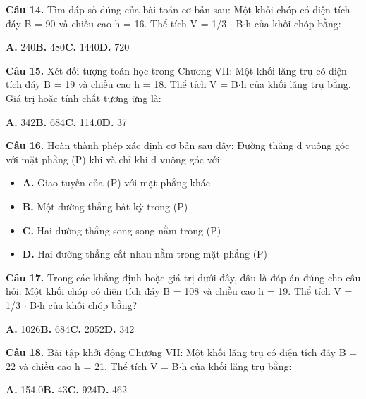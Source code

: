 \documentclass[11pt,a4paper]{article}
\begin{document}
\textbf{\color{primary} Câu 14.} Tìm đáp số đúng của bài toán cơ bản sau: Một khối chóp có diện tích đáy B = 90 và chiều cao h = 16. Thể tích V = 1/3 $\cdot$ B$\cdot$h của khối chóp bằng:\par
\hspace*{1.5em}\textbf{A.} 240\quad\quad \textbf{B.} 480\quad\quad \textbf{C.} 1440\quad\quad \textbf{D.} 720\par\vspace{2pt}
\textbf{\color{primary} Câu 15.} Xét đối tượng toán học trong Chương VII: Một khối lăng trụ có diện tích đáy B = 19 và chiều cao h = 18. Thể tích V = B$\cdot$h của khối lăng trụ bằng. Giá trị hoặc tính chất tương ứng là:\par
\hspace*{1.5em}\textbf{A.} 342\quad\quad \textbf{B.} 684\quad\quad \textbf{C.} 114.0\quad\quad \textbf{D.} 37\par\vspace{2pt}
\textbf{\color{primary} Câu 16.} Hoàn thành phép xác định cơ bản sau đây: Đường thẳng d vuông góc với mặt phẳng (P) khi và chỉ khi d vuông góc với:\par
\begin{itemize}\setlength{\itemsep}{1pt}\setlength{\parskip}{0pt}
  \item[] \textbf{A.} Giao tuyến của (P) với mặt phẳng khác
  \item[] \textbf{B.} Một đường thẳng bất kỳ trong (P)
  \item[] \textbf{C.} Hai đường thẳng song song nằm trong (P)
  \item[] \textbf{D.} Hai đường thẳng cắt nhau nằm trong mặt phẳng (P)
\end{itemize}\vspace{2pt}
\textbf{\color{primary} Câu 17.} Trong các khẳng định hoặc giá trị dưới đây, đâu là đáp án đúng cho câu hỏi: Một khối chóp có diện tích đáy B = 108 và chiều cao h = 19. Thể tích V = 1/3 $\cdot$ B$\cdot$h của khối chóp bằng?\par
\hspace*{1.5em}\textbf{A.} 1026\quad\quad \textbf{B.} 684\quad\quad \textbf{C.} 2052\quad\quad \textbf{D.} 342\par\vspace{2pt}
\textbf{\color{primary} Câu 18.} Bài tập khởi động Chương VII: Một khối lăng trụ có diện tích đáy B = 22 và chiều cao h = 21. Thể tích V = B$\cdot$h của khối lăng trụ bằng:\par
\hspace*{1.5em}\textbf{A.} 154.0\quad\quad \textbf{B.} 43\quad\quad \textbf{C.} 924\quad\quad \textbf{D.} 462\par\vspace{2pt}
\end{document}
